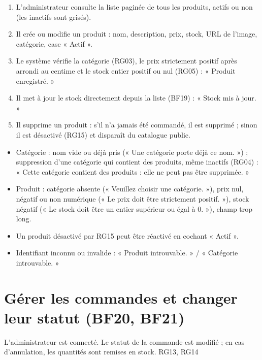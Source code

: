 \begin{enumerate}
  \item L'administrateur consulte la liste paginée de tous les produits, actifs ou non (les inactifs sont grisés).
  \item Il crée ou modifie un produit : nom, description, prix, stock, URL de l'image, catégorie, case « Actif ».
  \item Le système vérifie la catégorie (RG03), le prix strictement positif après arrondi au centime et le stock
        entier positif ou nul (RG05) : « Produit enregistré. »
  \item Il met à jour le stock directement depuis la liste (BF19) : « Stock mis à jour. »
  \item Il supprime un produit : s'il n'a jamais été commandé, il est supprimé ; sinon il est désactivé (RG15) et
        disparaît du catalogue public.
\end{enumerate}

\begin{itemize}
  \item Catégorie : nom vide ou déjà pris (« Une catégorie porte déjà ce nom. ») ; suppression d'une catégorie qui
        contient des produits, même inactifs (RG04) : « Cette catégorie contient des produits : elle ne peut pas
        être supprimée. »
  \item Produit : catégorie absente (« Veuillez choisir une catégorie. »), prix nul, négatif ou non numérique
        (« Le prix doit être strictement positif. »), stock négatif (« Le stock doit être un entier supérieur ou
        égal à 0. »), champ trop long.
  \item Un produit désactivé par RG15 peut être réactivé en cochant « Actif ».
  \item Identifiant inconnu ou invalide : « Produit introuvable. » / « Catégorie introuvable. »
\end{itemize}

\section{Gérer les commandes et changer leur statut (BF20, BF21)}

  {L'administrateur est connecté.}
  {Le statut de la commande est modifié ; en cas d'annulation, les quantités sont remises en stock.}
  {RG13, RG14}

